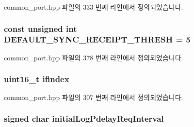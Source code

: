 common\+\_\+port.\+hpp 파일의 333 번째 라인에서 정의되었습니다.

\subsubsection[{\texorpdfstring{D\+E\+F\+A\+U\+L\+T\+\_\+\+S\+Y\+N\+C\+\_\+\+R\+E\+C\+E\+I\+P\+T\+\_\+\+T\+H\+R\+E\+SH}{DEFAULT_SYNC_RECEIPT_THRESH}}]{\setlength{\rightskip}{0pt plus 5cm}const unsigned int D\+E\+F\+A\+U\+L\+T\+\_\+\+S\+Y\+N\+C\+\_\+\+R\+E\+C\+E\+I\+P\+T\+\_\+\+T\+H\+R\+E\+SH = 5\hspace{0.3cm}{\ttfamily [static]}}\hypertarget{class_common_port_a60ff1c9798251f4f4be45dfb8ea91614}{}\label{class_common_port_a60ff1c9798251f4f4be45dfb8ea91614}


common\+\_\+port.\+hpp 파일의 378 번째 라인에서 정의되었습니다.

\subsubsection[{\texorpdfstring{ifindex}{ifindex}}]{\setlength{\rightskip}{0pt plus 5cm}uint16\+\_\+t ifindex\hspace{0.3cm}{\ttfamily [private]}}\hypertarget{class_common_port_af9eddbea0d06b00afe0a66dbe5371422}{}\label{class_common_port_af9eddbea0d06b00afe0a66dbe5371422}


common\+\_\+port.\+hpp 파일의 307 번째 라인에서 정의되었습니다.

\subsubsection[{\texorpdfstring{initial\+Log\+Pdelay\+Req\+Interval}{initialLogPdelayReqInterval}}]{\setlength{\rightskip}{0pt plus 5cm}signed char initial\+Log\+Pdelay\+Req\+Interval\hspace{0.3cm}{\ttfamily [private]}}\hypertarget{class_common_port_a7595d62409f4880035eb20c62b64ea7c}{}\label{class_common_port_a7595d62409f4880035eb20c62b64ea7c}


